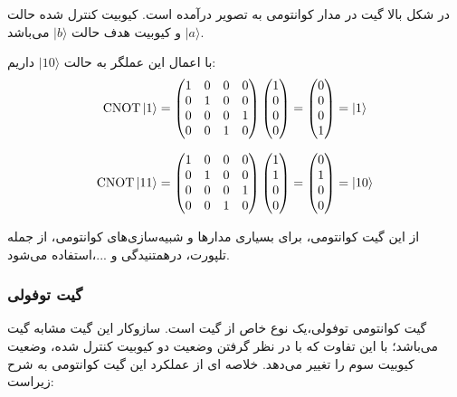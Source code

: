 \documentclass{book}
\begin{document}
در شکل بالا گیت  در مدار کوانتومی به تصویر درآمده است. کیوبیت کنترل شده  حالت $\vert a \rangle$ و کیوبیت هدف حالت $\vert b \rangle$ می‌باشد.


با اعمال این عملگر به حالت $\vert 10\rangle$ داریم:
$$
\text{CNOT} \ket{1} = \begin{pmatrix}
	1 & 0 & 0 & 0 \\
	0 & 1 & 0 & 0 \\
	0 & 0 & 0 & 1 \\
	0 & 0 & 1 & 0
\end{pmatrix} \begin{pmatrix}
	1 \\
	0 \\
	0 \\
	0
\end{pmatrix} = \begin{pmatrix}
	0 \\
	0 \\
	0 \\
	1
\end{pmatrix} = \ket{1}
$$


$$
\text{CNOT} \ket{11} = \begin{pmatrix}
	1 & 0 & 0 & 0 \\
	0 & 1 & 0 & 0 \\
	0 & 0 & 0 & 1 \\
	0 & 0 & 1 & 0
\end{pmatrix} \begin{pmatrix}
	1 \\
	1 \\
	0 \\
	0
\end{pmatrix} = \begin{pmatrix}
	0 \\
	1 \\
	0 \\
	0
\end{pmatrix} = \ket{10}
$$
\vspace{2cm}


از این گیت کوانتومی‌، برای بسیاری مدار‌ها و شبیه‌سازی‌های کوانتومی، از جمله تلپورت، درهمتنیدگی و ...،استفاده می‌شود.





\subsubsection*{گیت توفولی}
گیت کوانتومی توفولی،‌یک نوع خاص از گیت  است. سازوکار این گیت مشابه گیت  می‌‌باشد؛‌ با این تفاوت که با در نظر گرفتن وضعیت دو کیوبیت کنترل شده، وضعیت کیوبیت سوم را تغییر می‌دهد. خلاصه ای از عملکرد این گیت کوانتومی به شرح زیراست:
\end{document}
